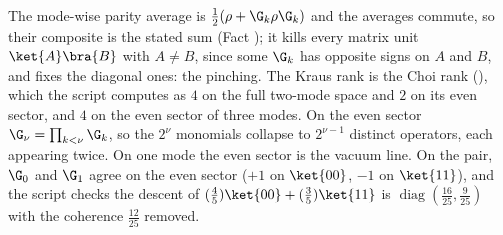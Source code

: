 The mode-wise parity average is $\tfrac12(\rho + \G_{k}\rho\G_{k})$ and the averages commute, so their composite is the stated sum (Fact ); it kills every matrix unit $\ket{A}\bra{B}$ with $A \neq B$, since some $\G_{k}$ has opposite signs on $A$ and $B$, and fixes the diagonal ones: the pinching. The Kraus rank is the Choi rank (), which the script computes as $4$ on the full two-mode space and $2$ on its even sector, and $4$ on the even sector of three modes. On the even sector $\G_{\nu} = \prod_{k < \nu}\G_{k}$, so the $2^{\nu}$ monomials collapse to $2^{\nu-1}$ distinct operators, each appearing twice. On one mode the even sector is the vacuum line. On the pair, $\G_{0}$ and $\G_{1}$ agree on the even sector ($+1$ on $\ket{00}$, $-1$ on $\ket{11}$), and the script checks the descent of $(\tfrac45)\ket{00} + (\tfrac35)\ket{11}$ is $\operatorname{diag}(\tfrac{16}{25}, \tfrac{9}{25})$ with the coherence $\tfrac{12}{25}$ removed.
